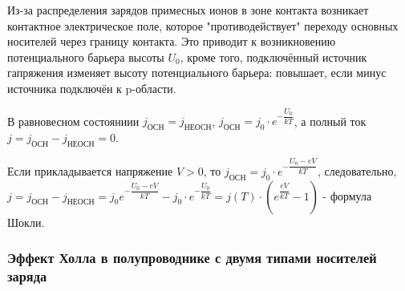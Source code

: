 Из-за распределения зарядов примесных ионов в зоне контакта возникает контактное электрическое поле,
которое "противодействует" переходу основных носителей через границу контакта. Это приводит к возникновению потенциального барьера высоты $U_0$, кроме того, подключённый источник гапряжения изменяет высоту потенциального барьера: повышает, если минус источника подключён к p-области.

В равновесном состояниии $j_\text{ОСН} = j_\text{НЕОСН}$, $j_\text{ОСН} = j_0 \cdot e^{-\dfrac{U_0}{kT}}$, а полный ток $j = j_\text{ОСН} - j_\text{НЕОСН} = 0$.

Если прикладывается напряжение $V>0$, то $j_\text{ОСН} = j_0 \cdot e^{-\dfrac{U_0-eV}{kT}}$, следовательно, $j = j_\text{ОСН} - j_\text{НЕОСН} = j_0 e^{-\dfrac{U_0-eV}{kT}} - j_0 \cdot e^{-\dfrac{U_0}{kT}} = j(T) \cdot \left( e^{\dfrac{eV}{kT}} - 1 \right) $ - формула Шокли.

\subsubsection{Эффект Холла в полупроводнике с двумя типами носителей заряда}

